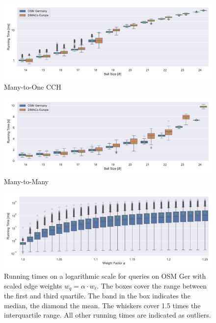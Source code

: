\documentclass[manuscript,review]{acmart}
\begin{document}
\begin{figure}
\centering
\includegraphics[width=\linewidth]{fig/lazy_rphast_cch_many_to_one.pdf}
\caption{
Many-to-One CCH
}\label{fig:many_to_one_cch}
\end{figure}

\begin{figure}
\centering
\includegraphics[width=\linewidth]{fig/lazy_rphast_many_to_many.pdf}
\caption{
Many-to-Many
}\label{fig:many_to_many}
\end{figure}

\begin{figure}
\centering
\includegraphics[width=\linewidth]{fig/scaled_weights.pdf}
\caption{
Running times on a logarithmic scale for queries on OSM Ger with scaled edge weights $w_q = \alpha \cdot w_\ell$.
The boxes cover the range between the first and third quartile.
The band in the box indicates the median, the diamond the mean.
The whiskers cover 1.5 times the interquartile range.
All other running times are indicated as outliers.
}\label{fig:scaled_weights}
\end{figure}
\end{document}
